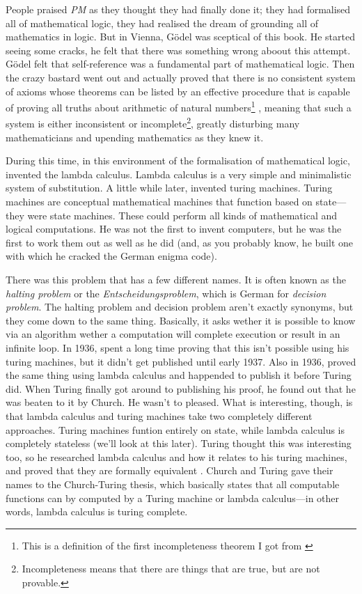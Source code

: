 \documentclass[11pt]{article}
\begin{document}
People praised \emph{PM} as they thought they had finally done it; they had
formalised all of mathematical logic, they had realised the dream of grounding
all of mathematics in logic. But in Vienna, Gödel was sceptical of this book.
He started seeing some cracks, he felt that there was something wrong aboout
this attempt. Gödel felt that self-reference was a fundamental part of
mathematical logic. Then the crazy bastard went out and actually proved that
there is no consistent system of axioms whose theorems can be listed by an
effective procedure that is capable of proving all truths about arithmetic of
natural numbers\footnote{This is a definition of the first incompleteness
theorem I got from \textcite{wiki:Incompleteness_theorems}}
\parencite{godel1931}, meaning that such a system is either inconsistent or
incomplete\footnote{Incompleteness means that there are things that are true,
but are not provable.}, greatly disturbing many mathematicians and upending
mathematics as they knew it.

During this time, in this environment of the formalisation of mathematical
logic, \textcite{church1932} invented the lambda calculus. Lambda calculus is a
very simple and minimalistic system of substitution. A little while later,
\textcite{turing1936, turing1937correction} invented turing machines. Turing
machines are conceptual mathematical machines that function based on
state---they were state machines. These could perform all kinds of mathematical
and logical computations. He was not the first to invent computers, but he was
the first to work them out as well as he did (and, as you probably know, he
built one with which he cracked the German enigma code).

There was this problem that has a few different names. It is often known as the
\emph{halting problem} or the \emph{Entscheidungsproblem}, which is German for
\emph{decision problem}. The halting problem and decision problem aren't
exactly synonyms, but they come down to the same thing. Basically, it asks
wether it is possible to know via an algorithm wether a computation will
complete execution or result in an infinite loop. In 1936,
\textcite{turing1936, turing1937correction} spent a long time proving that this
isn't possible using his turing machines, but it didn't get published until
early 1937. Also in 1936, \textcite{church1936} proved the same thing using
lambda calculus and happended to publish it before Turing did. When Turing
finally got around to publishing his proof, he found out that he was beaten to
it by Church. He wasn't to pleased. What is interesting, though, is that lambda
calculus and turing machines take two completely different approaches. Turing
machines funtion entirely on state, while lambda calculus is completely
stateless (we'll look at this later). Turing thought this was interesting too,
so he researched lambda calculus and how it relates to his turing machines, and
proved that they are formally equivalent \parencite{turing1937computability}.
Church and Turing gave their names to the Church-Turing thesis, which basically
states that all computable functions can by computed by a Turing machine or
lambda calculus---in other words, lambda calculus is turing complete.
\end{document}
